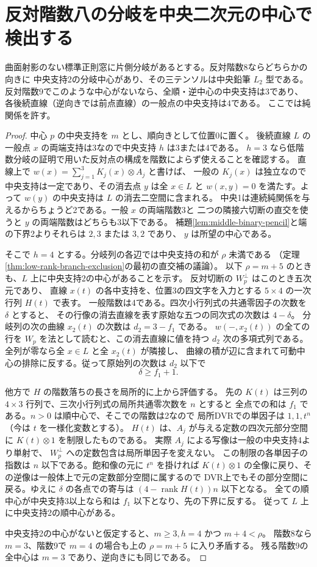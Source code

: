 \section{反対階数八の分岐を中央二次元の中心で検出する}
\label{sec:branch-middle-defect-bound}
\begin{theorem}\label{thm:branch-middle-defect-bound}
曲面射影のない標準正則窓に片側分岐があるとする。反対階数8ならどちらかの向きに
中央支持2の分岐中心があり、その三テンソルは中央鉛筆 $L_2$ 型である。
反対階数9でこのような中心がないなら、全順・逆中心の中央支持は3であり、
各後続直線（逆向きでは前点直線）の一般点の中央支持は4である。
ここでは純関係を許す。
\end{theorem}
\begin{proof}
中心 $p$ の中央支持を $m$ とし、順向きとして位置0に置く。
後続直線 $L$ の一般点 $x$ の両端支持は3なので中央支持 $h$ は3または4である。
$h=3$ なら低階数分岐の証明で用いた反対点の構成を階数によらず使えることを確認する。
直線上で $w(x)=\sum_{j=1}^3 K_j(x)\otimes A_j$ と書けば、
一般の $K_j(x)$ は独立なので中央支持は一定であり、その消去点 $y$ は全 $x\in L$ と
$w(x,y)=0$ を満たす。よって $w(y)$ の中央支持は $L$ の消去二空間に含まれる。
中央1は連続純関係を与えるからちょうど2である。一般 $x$ の両端階数3と
二つの隣接六切断の直交を使うと $y$ の両端階数はどちらも3以下である。
補題\ref{lem:middle-binary-pencil}と端の下界2よりそれらは $2,3$ または $3,2$ であり、
$y$ は所望の中心である。

そこで $h=4$ とする。分岐列の各辺では中央支持の和が $\rho$ 未満である
（定理\ref{thm:low-rank-branch-exclusion}の最初の直交補の議論）。
以下 $\rho=m+5$ のときも、$L$ 上に中央支持2の中心があることを示す。
反対切断の $W_p^\perp$ はこのとき五次元であり、
直線 $x(t)$ の各中支持を、位置3の四文字を入力とする $5\times4$ の一次行列 $H(t)$ で表す。
一般階数は4である。四次小行列式の共通零因子の次数を $\delta$ とすると、
その行像の消去直線を表す原始な五つの同次式の次数は $4-\delta$。
分岐列の次の曲線 $x_2(t)$ の次数は $d_2=3-f_1$ である。
$w(-,x_2(t))$ の全ての行を $W_p$ を法として読むと、この消去直線に値を持つ
$d_2$ 次の多項式列である。全列が零なら全 $x\in L$ と全 $x_2(t)$ が隣接し、
曲線の積が辺に含まれて可動中心の排除に反する。従って原始列の次数は $d_2$ 以下で
\[
                           \delta\ge f_1+1 .
\]

他方で $H$ の階数落ちの長さを局所的に上から評価する。
先の $K(t)$ は三列の $4\times3$ 行列で、三次小行列式の局所共通零次数を $n$ とすると
全点での和は $f_1$ である。$n>0$ は順中心で、そこでの階数は2なので
局所DVRでの単因子は $1,1,t^n$（今は $t$ を一様化変数とする）。
$H(t)$ は、$A_j$ が与える定数の四次元部分空間に $K(t)\otimes 1$ を制限したものである。
実際 $A_j$ による写像は一般の中央支持4より単射で、
$W_p^\perp$ への定数包含は局所単因子を変えない。
この制限の各単因子の指数は $n$ 以下である。飽和像の元に $t^n$ を掛ければ
$K(t)\otimes1$ の全像に戻り、その逆像は一般体上で元の定数部分空間に属するので
DVR上でもその部分空間に戻る。ゆえに $\delta$ の各点での寄与は
$(4-\operatorname{rank}H(t))n$ 以下となる。
全ての順中心が中央支持3以上なら和は $f_1$ 以下となり、先の下界に反する。
従って $L$ 上に中央支持2の順中心がある。

中央支持2の中心がないと仮定すると、$m\ge3,h=4$ かつ $m+4<\rho$。
階数8なら $m=3$、階数9で $m=4$ の場合も上の $\rho=m+5$ に入り矛盾する。
残る階数9の全中心は $m=3$ であり、逆向きにも同じである。
\end{proof}
